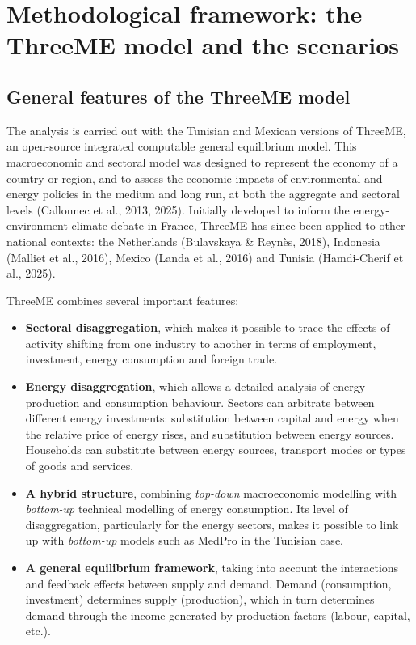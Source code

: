 \documentclass[12pt, a4paper]{article}
\begin{document}
\section{Methodological framework: the ThreeME model and the scenarios}
\label{sec:framework}

\subsection{General features of the ThreeME model}
\label{subsec:threeme}

The analysis is carried out with the Tunisian and Mexican versions of ThreeME, an open-source integrated computable general equilibrium model. This macroeconomic and sectoral model was designed to represent the economy of a country or region, and to assess the economic impacts of environmental and energy policies in the medium and long run, at both the aggregate and sectoral levels (Callonnec et al., 2013, 2025). Initially developed to inform the energy-environment-climate debate in France, ThreeME has since been applied to other national contexts: the Netherlands (Bulavskaya \& Reynès, 2018), Indonesia (Malliet et al., 2016), Mexico (Landa et al., 2016) and Tunisia (Hamdi-Cherif et al., 2025).

ThreeME combines several important features:

\begin{itemize}
    \item \textbf{Sectoral disaggregation}, which makes it possible to trace the effects of activity shifting from one industry to another in terms of employment, investment, energy consumption and foreign trade.
    \item \textbf{Energy disaggregation}, which allows a detailed analysis of energy production and consumption behaviour. Sectors can arbitrate between different energy investments: substitution between capital and energy when the relative price of energy rises, and substitution between energy sources. Households can substitute between energy sources, transport modes or types of goods and services.
    \item \textbf{A hybrid structure}, combining \textit{top-down} macroeconomic modelling with \textit{bottom-up} technical modelling of energy consumption. Its level of disaggregation, particularly for the energy sectors, makes it possible to link up with \textit{bottom-up} models such as MedPro in the Tunisian case.
    \item \textbf{A general equilibrium framework}, taking into account the interactions and feedback effects between supply and demand. Demand (consumption, investment) determines supply (production), which in turn determines demand through the income generated by production factors (labour, capital, etc.).
\end{itemize}
\end{document}
